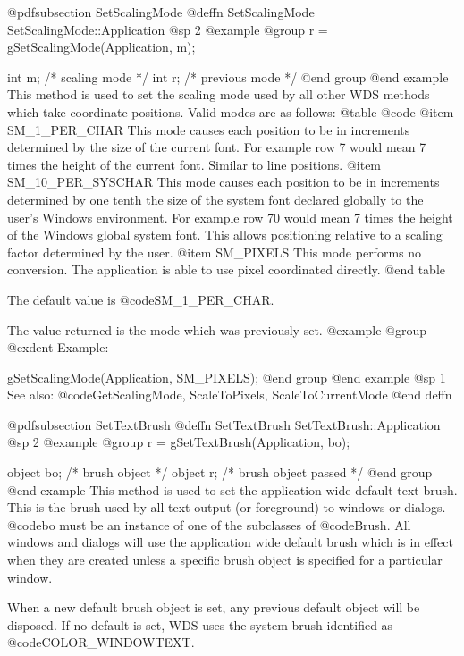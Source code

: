 @pdfsubsection {SetScalingMode}
@deffn {SetScalingMode} SetScalingMode::Application
@sp 2
@example
@group
r = gSetScalingMode(Application, m);

int     m;      /*  scaling mode   */
int     r;      /*  previous mode  */
@end group
@end example
This method is used to set the scaling mode used by all other WDS methods
which take coordinate positions.  Valid modes are as follows:
@table @code
@item SM_1_PER_CHAR
This mode causes each position to be in increments determined by the
size of the current font.  For example row 7 would mean 7 times the
height of the current font.  Similar to line positions.
@item SM_10_PER_SYSCHAR
This mode causes each position to be in increments determined by one
tenth the size of the system font declared globally to the user's
Windows environment.  For example row 70 would mean 7 times the height
of the Windows global system font.  This allows positioning relative
to a scaling factor determined by the user.
@item SM_PIXELS
This mode performs no conversion.  The application is able to use
pixel coordinated directly.
@end table

The default value is @code{SM_1_PER_CHAR}.

The value returned is the mode which was previously set.
@example
@group
@exdent Example:

gSetScalingMode(Application, SM_PIXELS);
@end group
@end example
@sp 1
See also:  @code{GetScalingMode, ScaleToPixels, ScaleToCurrentMode}
@end deffn














@pdfsubsection {SetTextBrush}
@deffn {SetTextBrush} SetTextBrush::Application
@sp 2
@example
@group
r = gSetTextBrush(Application, bo);

object  bo;     /*  brush object         */
object  r;      /*  brush object passed  */
@end group
@end example
This method is used to set the application wide default text brush.
This is the brush used by all text output (or foreground) to windows or
dialogs.  @code{bo} must be an instance of one of the subclasses of
@code{Brush}.  All windows and dialogs will use the application wide
default brush which is in effect when they are created unless a specific
brush object is specified for a particular window.

When a new default brush object is set, any previous default object
will be disposed.  If no default is set, WDS uses the system brush
identified as @code{COLOR_WINDOWTEXT}.

